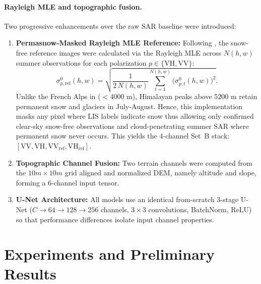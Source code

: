 \documentclass{article}
\newif\ifshowguide
\newcommand{\guide}[1]{%
  \ifshowguide
    \par\medskip\noindent
    \fcolorbox{blue!50}{blue!4}{%
      \begin{minipage}{\dimexpr\linewidth-2\fboxsep-2\fboxrule\relax}
        \small\color{blue!55!black}\textbf{Guidance.} #1
      \end{minipage}}%
    \par\medskip
  \fi}
\begin{document}
\paragraph{Rayleigh MLE and topographic fusion.}
Two progressive enhancements over the raw SAR baseline were introduced:
\begin{enumerate}
  \item \textbf{Permasnow-Masked Rayleigh MLE Reference:} Following \citet{briand2026weakly}, the snow-free reference images were calculated via the Rayleigh MLE across $N(h,w)$ summer observations for each polarization $p \in \{\text{VH}, \text{VV}\}$:
  \begin{equation}
    \sigma^0_{p,\text{ref}}(h, w) = \sqrt{\frac{1}{2\,N(h,w)} \sum_{t=1}^{N(h,w)} \big(\sigma^0_{p,t}(h,w)\big)^2}.
    \label{eq:mle}
  \end{equation}
  Unlike the French Alps in \citet{briand2026weakly} ($<4000\text{ m}$), Himalayan peaks above $5200\text{ m}$ retain permanent snow and glaciers in July-August. Hence, this implementation masks any pixel where LIS labels indicate snow thus allowing only confirmed clear-sky snow-free observations and cloud-penetrating summer SAR where permanent snow never occurs. This yields the 4-channel Set~B stack: $[\text{VV}, \text{VH}, \text{VV}_{\text{ref}}, \text{VH}_{\text{ref}}]$.
  \item \textbf{Topographic Channel Fusion:} Two terrain channels were computed from the $10m \times 10m$ grid aligned and normalized DEM, namely altitude and slope, forming a 6-channel input tensor.
  \item \textbf{U-Net Architecture:} All models use an identical from-scratch 3-stage U-Net ($C \rightarrow 64 \rightarrow 128 \rightarrow 256$ channels, $3\times3$ convolutions, BatchNorm, ReLU) so that performance differences isolate input channel properties.
\end{enumerate}

\section{Experiments and Preliminary Results}
\label{sec:results}

\guide{About 1.5--2 pages. Report only
what you have actually run. Preliminary or negative results are acceptable and
should be reported honestly. If you have no results yet, report your
experimental setup in full and any pilot experiments, and explain what blocked
progress.}
\end{document}
